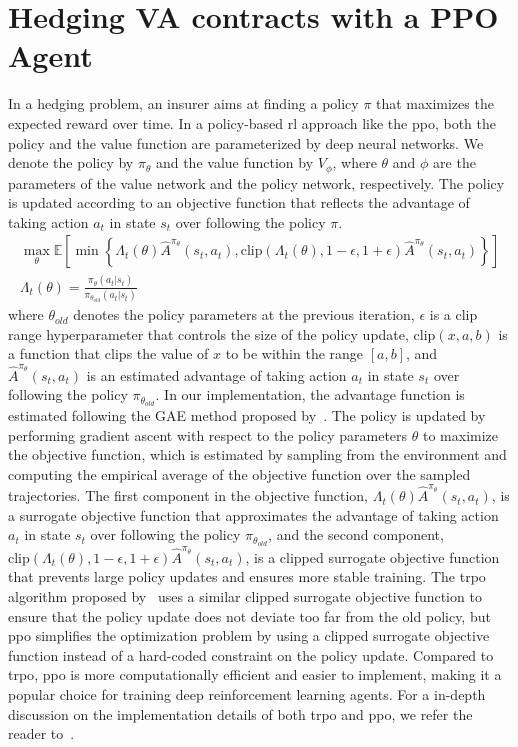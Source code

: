 \section{Hedging VA contracts with a PPO Agent} \label{sec:PPO}
In a hedging problem, an insurer aims at finding a policy $\pi$ that maximizes the expected reward over time.
In a policy-based \gls{rl} approach like the \gls{ppo}, both the policy and the value function are parameterized by deep neural networks.
We denote the policy by $\pi_{\theta}$ and the value function by $V_{\phi}$, where $\theta$ and $\phi$ are the parameters of the value network and the policy network, respectively.
The policy is updated according to an objective function that reflects the advantage of taking action $a_t$ in state $s_t$ over following the policy $\pi$.
\begin{align}
    \max_{\theta} \mathbb{E}\left[ \min \left\{ \Lambda_t(\theta)\hat{A}^{\pi_{\theta}}(s_t, a_t), \text{clip}(\Lambda_t(\theta), 1-\epsilon, 1 + \epsilon) \hat{A}^{\pi_{\theta}}(s_t, a_t)  \right\} \right] \\
    \Lambda_t(\theta) = \frac{\pi_{\theta}(a_t|s_t)}{\pi_{\theta_{old}}(a_t|s_t)} 
\end{align}
where $\theta_{old}$ denotes the policy parameters at the previous iteration, $\epsilon$ is a clip range hyperparameter that controls the size of the policy update, $\text{clip}(x, a, b)$ is a function that clips the value of $x$ to be within the range $[a, b]$, and $\hat{A}^{\pi_{\theta}}(s_t, a_t)$ is an estimated advantage of taking action $a_t$ in state $s_t$ over following the policy $\pi_{\theta_{old}}$.
In our implementation, the advantage function is estimated following the GAE method proposed by~\cite{schulman2015high}.
The policy is updated by performing gradient ascent with respect to the policy parameters $\theta$ to maximize the objective function, which is estimated by sampling from the environment and computing the empirical average of the objective function over the sampled trajectories.
The first component in the objective function, $\Lambda_t(\theta) \hat{A}^{\pi_{\theta}}(s_t, a_t)$, is a surrogate objective function that approximates the advantage of taking action $a_t$ in state $s_t$ over following the policy $\pi_{\theta_{old}}$, and the second component, $\text{clip}(\Lambda_t(\theta), 1-\epsilon, 1 + \epsilon) \hat{A}^{\pi_{\theta}}(s_t, a_t)$, is a clipped surrogate objective function that prevents large policy updates and ensures more stable training.
The \gls{trpo} algorithm proposed by~\cite{schulman2015trust} uses a similar clipped surrogate objective function to ensure that the policy update does not deviate too far from the old policy, but \gls{ppo} simplifies the optimization problem by using a clipped surrogate objective function instead of a hard-coded constraint on the policy update.
Compared to \gls{trpo}, \gls{ppo} is more computationally efficient and easier to implement, making it a popular choice for training deep reinforcement learning agents.
For a in-depth discussion on the implementation details of both \gls{trpo} and \gls{ppo}, we refer the reader to~\cite{engstrom2020implementation}.

